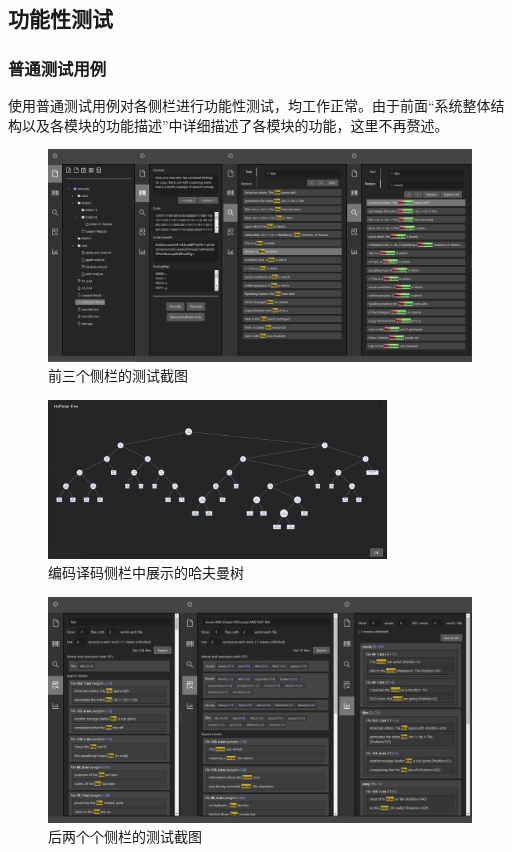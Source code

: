 \documentclass[scheme = chinese]{ctexart}
\begin{document}
\subsection{功能性测试}

\subsubsection{普通测试用例}
使用普通测试用例对各侧栏进行功能性测试，均工作正常。由于前面“系统整体结构以及各模块的功能描述”中详细描述了各模块的功能，这里不再赘述。

\begin{figure}[h]
    \centering
    \includegraphics[width=\textwidth]{images/测试-1.png}
    \caption{前三个侧栏的测试截图}
\end{figure}

\begin{figure}[h]
    \centering
    \includegraphics[width=0.8\textwidth]{images/测试-哈夫曼树.png}
    \caption{编码译码侧栏中展示的哈夫曼树}
\end{figure}

\begin{figure}[H]
    \centering
    \includegraphics[width=\textwidth]{images/测试-2.png}
    \caption{后两个个侧栏的测试截图}
\end{figure}
\end{document}

